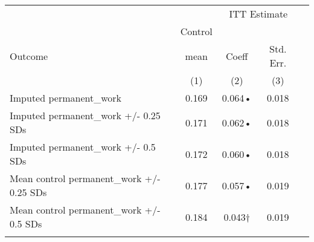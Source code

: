 \begin{tabular}{lcccc}
\hline \noalign{\smallskip} &  & \multicolumn{2}{c}{{ ITT Estimate}} & \\
\cline{3-4} & Control &  &  & \\
Outcome & mean & Coeff & Std. Err. & \\
 & (1) & (2) & (3) & \\
\noalign{\smallskip}\hline \noalign{\smallskip}Imputed permanent\_work & 0.169 & 0.064• & 0.018 & \\
Imputed permanent\_work +/- 0.25 SDs & 0.171 & 0.062• & 0.018 & \\
Imputed permanent\_work +/- 0.5 SDs & 0.172 & 0.060• & 0.018 & \\
Mean control permanent\_work +/- 0.25 SDs & 0.177 & 0.057• & 0.019 & \\
Mean control permanent\_work +/- 0.5 SDs & 0.184 & 0.043† & 0.019 & \\
\noalign{\smallskip}\hline\end{tabular}\\
